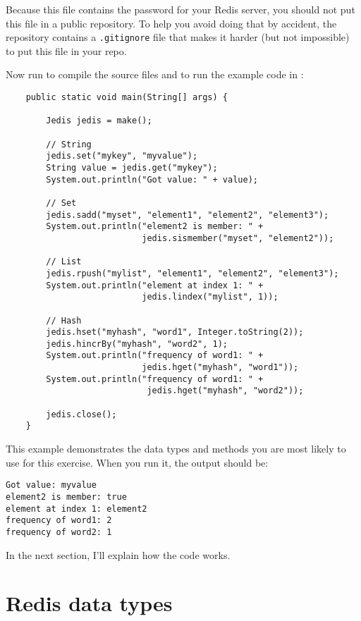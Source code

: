 \documentclass[12pt]{book}
\theoremstyle{exercise}
\begin{document}
Because this file contains the password for your Redis server, you
should not put this file in a public repository. To help you avoid
doing that by accident, the repository contains a {\tt .gitignore}
file that makes it harder (but not impossible) to put this file
in your repo.


Now run  to compile the
source files and  to run the example code in
:

\begin{verbatim}
    public static void main(String[] args) {

        Jedis jedis = make();
        
        // String
        jedis.set("mykey", "myvalue");
        String value = jedis.get("mykey");
        System.out.println("Got value: " + value);
        
        // Set
        jedis.sadd("myset", "element1", "element2", "element3");
        System.out.println("element2 is member: " + 
                           jedis.sismember("myset", "element2"));
        
        // List
        jedis.rpush("mylist", "element1", "element2", "element3");
        System.out.println("element at index 1: " + 
                           jedis.lindex("mylist", 1));
        
        // Hash
        jedis.hset("myhash", "word1", Integer.toString(2));
        jedis.hincrBy("myhash", "word2", 1);
        System.out.println("frequency of word1: " + 
                           jedis.hget("myhash", "word1"));
        System.out.println("frequency of word1: " + 
                            jedis.hget("myhash", "word2"));
        
        jedis.close();
    }
\end{verbatim}

This example demonstrates the data types and methods you are most likely
to use for this exercise. When you run it, the output should be:

\begin{verbatim}
Got value: myvalue
element2 is member: true
element at index 1: element2
frequency of word1: 2
frequency of word2: 1
\end{verbatim}

In the next section, I'll explain how the code works.


\newcommand{\redis}{\textit}

\section{Redis data types}
\label{redis-data-types}
\end{document}

